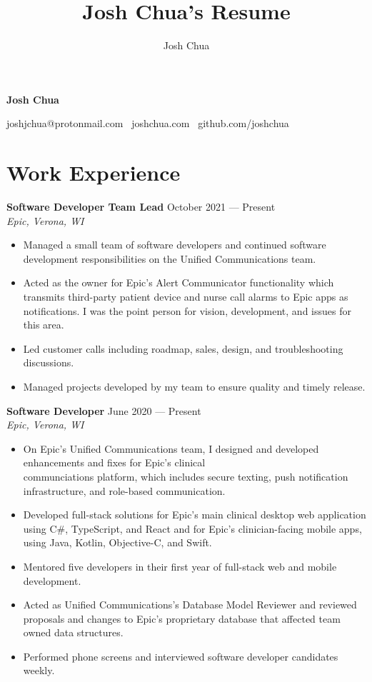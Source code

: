 \documentclass{article}
\title{Josh Chua's Resume}
\author{Josh Chua}
\begin{document}
\centerline{\LARGE\textbf{Josh Chua}}
\smallskip
\centerline{
  joshjchua@protonmail.com \textbullet \
  joshchua.com \textbullet \
  github.com/joshchua}

\section*{Work Experience}
\textbf{Software Developer Team Lead} \hfill October 2021 --- Present\\
\textit{Epic, Verona, WI}
\begin{itemize}
\item Managed a small team of software developers and continued software development
  responsibilities on the Unified Communications team.
\item Acted as the owner for Epic's Alert Communicator functionality which
  transmits third-party patient device and nurse call alarms to Epic apps as
  notifications. I was the point person for vision, development, and issues
  for this area.
\item Led customer calls including roadmap, sales, design, and troubleshooting discussions.
\item Managed projects developed by my team to ensure quality and timely release.
\end{itemize}
\medskip

\textbf{Software Developer} \hfill June 2020 --- Present\\
\textit{Epic, Verona, WI}
\begin{itemize}
\item On Epic's Unified Communications team, I designed and developed
  enhancements and fixes for Epic's clinical\\ communciations platform, which
  includes secure texting, push notification infrastructure, and role-based
  communication.
\item Developed full-stack solutions for Epic's main clinical desktop web application
  using C\#, TypeScript, and React and for Epic's clinician-facing mobile apps, using Java,
  Kotlin, Objective-C, and Swift.
\item Mentored five developers in their first year of full-stack web and
  mobile development.
\item Acted as Unified Communications's Database Model Reviewer and reviewed
  proposals and changes to Epic's proprietary database that affected team owned
  data structures.
\item Performed phone screens and interviewed software developer candidates weekly.
\end{itemize}
\medskip
\end{document}
